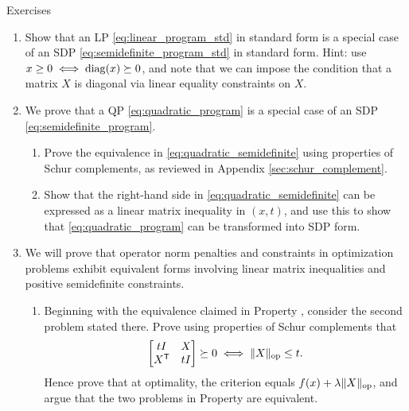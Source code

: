 \begin{xcb}{Exercises}
\begin{enumerate}[label=\thechapter.\arabic*]
\begin{enumerate}[label=\alph*.]
\item Show that the last display is equivalent to a linear matrix inequality 
  in $\vek(X)$; and the positive semidefinite constraint $X \succeq 0$ is also
  equivalent to a linear matrix inequality in $\vek(X)$. Putting this together
  proves that \eqref{eq:semidefinite_program_std} is of SDP form
  \eqref{eq:semidefinite_program}.      
\end{enumerate}

\item \label{ex:lps_are_sdps_std} 
  Show that an LP \eqref{eq:linear_program_std} in standard form is a special case
  of an SDP \eqref{eq:semidefinite_program_std} in standard form. Hint: use $x 
  \geq 0 \iff \operatorname{diag}(x) \succeq 0$, and note that we can impose the condition
  that a matrix $X$ is diagonal via linear equality constraints on $X$.   

\item \label{ex:qps_are_sdps}
  We prove that a QP \eqref{eq:quadratic_program} is a special case of an SDP
  \eqref{eq:semidefinite_program}. 

\begin{enumerate}[label=\alph*.]
\item Prove the equivalence in \eqref{eq:quadratic_semidefinite} using
  properties of Schur complements, as reviewed in Appendix
  \ref{sec:schur_complement}.

\item Show that the right-hand side in \eqref{eq:quadratic_semidefinite} can be
  expressed as a linear matrix inequality in $(x,t)$, and use this to show that  
  \eqref{eq:quadratic_program} can be transformed into SDP form.
\end{enumerate}

\item \label{ex:operator_norm_semidefinite}
  We will prove that operator norm penalties and constraints in optimization 
  problems exhibit equivalent forms involving linear matrix inequalities and 
  positive semidefinite constraints. 

\begin{enumerate}[label=\alph*.]
\item Beginning with the equivalence claimed in Property
  , consider the second problem stated 
  there. Prove using properties of Schur complements that
  \[
  \begin{bmatrix} t I & X \\ X^{\mathsf{T}} & t I \end{bmatrix} \succeq 0 
  \iff \|X\|_{\mathrm{op}} \leq t.
  \]
  Hence prove that at optimality, the criterion equals $f(x) + \lambda
  \|X\|_{\mathrm{op}}$, and argue that the two problems in Property
   are equivalent.    


\end{enumerate}
\end{enumerate}
\end{xcb}
